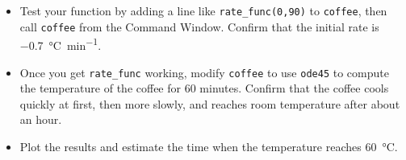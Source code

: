 \documentclass[main.tex]{subfiles}
\begin{document}
\begin{ex}
\begin{itemize}
\item Test your function by adding a line like {\tt rate\_func(0,90)}
to {\tt coffee}, then call {\tt coffee} from the {\sf Command Window}.
Confirm that the initial rate is \SI{-0.7}{\celsius \per \minute}.

\item Once you get {\tt rate\_func} working, modify
{\tt coffee} to use {\tt ode45} to compute the temperature
of the coffee for 60 minutes.  Confirm that
the coffee cools quickly at first, then more slowly, and reaches
room temperature after about an hour.

\item Plot the results and estimate the time when the temperature reaches \SI{60}{\celsius}.

\end{itemize}

\end{ex}
\end{document}
